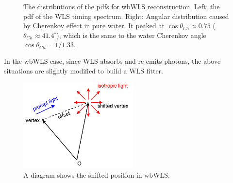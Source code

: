 \documentclass[preprint,12pt]{elsarticle}
\numberwithin{equation}{section}
\begin{document}
\begin{figure}[htbp]	
	\centering	
	\caption{\label{WLS_pdf} The distributions of the pdfs for wbWLS reconstruction. Left: the pdf of the WLS timing spectrum. Right: Angular distribution caused by Cherenkov effect in pure water. It peaked at $\cos\theta_{Ch}\approx 0.75$ ($\theta_{Ch}\approx 41.4^\circ$), which is the same to the water Cherenkov angle $\cos\theta_{Ch}=1/1.33$.}	
\end{figure}

In the wbWLS case, since WLS absorbs and re-emits photons, the above situations are slightly modified to build a WLS fitter.

\begin{figure}[htbp]
	\centering	
	\includegraphics[width=6cm]{FitterDiagram.pdf}
	\caption{\label{FitterDiagram} 
		A diagram shows the shifted position in wbWLS.
	}
\end{figure}
\end{document}
